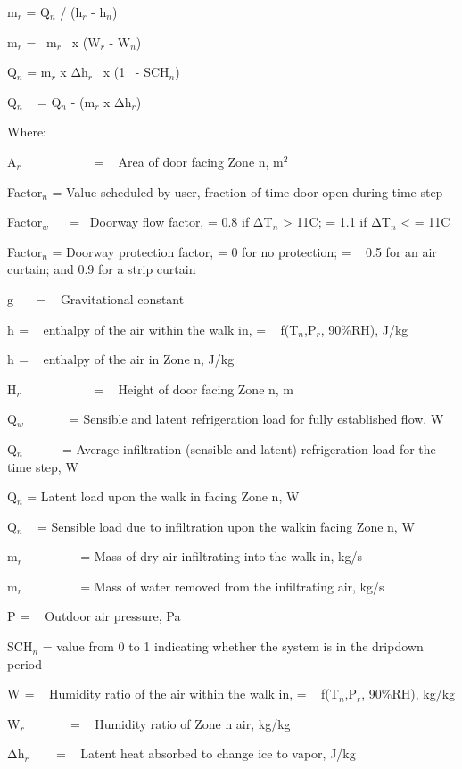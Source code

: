 m\(_{r}\) = Q\(_{n}\) / (h\(_{r}\) - h\(_{n}\))

m\(_{r}\) = ~m\(_{r}\) ~x (W\(_{r}\) - W\(_{n}\))

Q\(_{n}\) = m\(_{r}\) x Δh\(_{r}\) ~x (1 ~- SCH\(_{n}\))

Q\(_{n}\) ~ = Q\(_{n}\) - (m\(_{r}\) x Δh\(_{r}\))

Where:

A\(_{r}\)~~~~~~~~~~~ = ~ Area of door facing Zone n, m\(^{2}\)

Factor\(_{n}\) = Value scheduled by user, fraction of time door open during time step

Factor\(_{w}\) ~~ = ~Doorway flow factor, = 0.8 if ΔT\(_{n}\) \textgreater{} 11C; = 1.1 if ΔT\(_{n}\) \textless{} = 11C

Factor\(_{n}\) = Doorway protection factor, = 0 for no protection; = ~ 0.5 for an air curtain; and 0.9 for a strip curtain

g~~~ = ~ Gravitational constant

h\(_{ }\) = ~ enthalpy of the air within the walk in, = ~ f(T\(_{n}\),P\(_{r}\), 90\%RH), J/kg

h\(_{ }\) = ~ enthalpy of the air in Zone n, J/kg

H\(_{r}\)~~~~~~~~~~~ = ~ Height of door facing Zone n, m

Q\(_{w}\) ~~~~~~ = Sensible and latent refrigeration load for fully established flow, W

Q\(_{n}\) ~~~~~ = Average infiltration (sensible and latent) refrigeration load for the time step, W

Q\(_{n}\) = Latent load upon the walk in facing Zone n, W

Q\(_{n}\) ~ = Sensible load due to infiltration upon the walkin facing Zone n, W

m\(_{r}\) ~~~~~~~~ = Mass of dry air infiltrating into the walk-in, kg/s

m\(_{r}\) ~~~~~~~~ = Mass of water removed from the infiltrating air, kg/s

P\(_{ }\) = ~ Outdoor air pressure, Pa

SCH\(_{n}\) = value from 0 to 1 indicating whether the system is in the dripdown period

W\(_{ }\) = ~ Humidity ratio of the air within the walk in, = ~ f(T\(_{n}\),P\(_{r}\), 90\%RH), kg/kg

W\(_{r}\) ~~~~~~ = ~ Humidity ratio of Zone n air, kg/kg

Δh\(_{r}\) ~~~ = ~ Latent heat absorbed to change ice to vapor, J/kg

